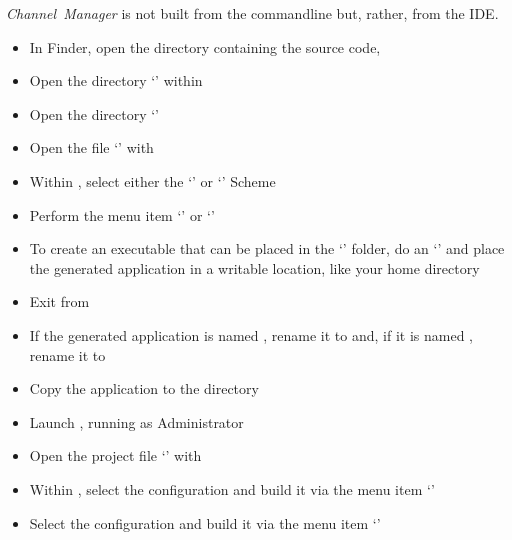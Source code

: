 \tertiaryEnd
\secondaryEnd
{}
\textit{Channel~Manager} is not built from the command\longDash{}line but, rather, from
the IDE.
\begin{itemize}
\item In Finder, open the directory containing the \mplusm{} source code, 
\item\exSp{} Open the directory `' within
\item\exSp{} Open the directory `'
\item\exSp{} Open the file `' with 
\item\exSp{} Within , select either the `' or
`' Scheme
\item\exSp{} Perform the menu item `' or
`'
\item\exSp{} To create an executable that can be placed in the `'
folder, do an `'
and place the generated application in a writable location, like your home directory
\item\exSp{} Exit from 
\item\exSp{} If the generated application is named , rename
it to  and, if it is named ,
rename it to 
\item\exSp{} Copy the  application to the 
directory
\end{itemize}
\tertiaryEnd
{}
\begin{itemize}
\item Launch , running as Administrator
\item\exSp{} Open the project file
`' with
\item\exSp{} Within , select the  configuration and
build it via the menu item `'
\item\exSp{} Select the  configuration and build it via the menu item
`'
\end{itemize}
